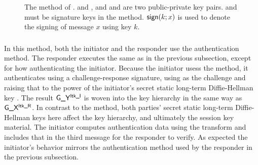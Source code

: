 \begin{figure}[!h]
{}
    \caption{The \mSigStat{} method of \mEdhoc. \mCredi{} and \mLtki, and
        \mCredr{} and \mLtkr{} are two public-private key pairs. \mCredi{} and
    \mLtki{} must be signature keys in the \mSig{} method. $\text{\textup{\textsf{sign}}}(k; x)$ is
    used to denote the signing of message $x$ using key $k$.}
\label{fig:edhocsigstat}
\end{figure}

\subsubsection{\mStatStat}
In this method, both the initiator and the responder use the \mStat{}
authentication method.
%
The responder executes the same as in the previous subsection, except for how
authenticating the initiator.
%
Because the initiator usess the \mStat{} method, it authenticates using a
challenge-response signature, using \mGy{} as the challenge and raising that to
the power of the initiator's secret static long-term Diffie-Hellman key
\mLtki{}.
%
The result $\text{\textup{\textsf{G\_Y}}}{}^{\text{\textup{\textsf{ltk\_I}}}}{}$ is woven into the key hierarchy in the same way as
$\text{\textup{\textsf{G\_X}}}{}^{\text{\textup{\textsf{ltk\_R}}}}{}$.
%
In contrast to the \mSigStat{} method, both parties' secret static long-term
Diffie-Hellman keys here affect the key hierarchy, and ultimately the session
key material.
%
The initiator computes authentication data using the \mAead transform
and includes that in the third message for the responder to verify.
%
As expected the initiator's behavior mirrors the \mStat{} authentication method
used by the responder in the previous subsection.

